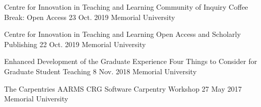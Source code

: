 \begin{cventries}
  \cventry
    {Centre for Innovation in Teaching and Learning} %
    {Community of Inquiry Coffee Break: Open Access} %
    {23 Oct. 2019} %
    {Memorial University} %
    {
    }

  \cventry
    {Centre for Innovation in Teaching and Learning} %
    {Open Access and Scholarly Publishing} %
    {22 Oct. 2019} %
    {Memorial University} %
    {
    }

  \cventry
    {Enhanced Development of the Graduate Experience} %
    {Four Things to Consider for Graduate Student Teaching} %
    {8 Nov. 2018} %
    {Memorial University} %
    {
    }

  \cventry
    {The Carpentries} %
    {AARMS CRG Software Carpentry Workshop} %
    {27 May 2017} %
    {Memorial University} %
    {
    }


\end{cventries}
